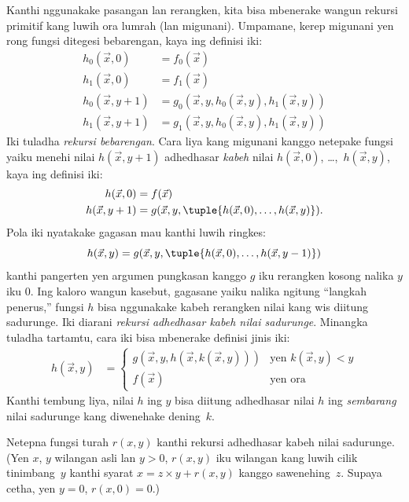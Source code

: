 \documentclass[../../../include/open-logic-section]{subfiles}
\begin{document}

Kanthi nggunakake pasangan lan rerangken, kita bisa
mbenerake wangun rekursi primitif kang luwih ora lumrah
(lan migunani). Umpamane, kerep migunani yen rong
fungsi ditegesi bebarengan, kaya ing definisi iki:
\begin{align*}
h_0(\vec x, 0) & = f_0(\vec x) \\
h_1(\vec x, 0) & = f_1(\vec x) \\
h_0(\vec x, y+1) & = g_0(\vec x, y, h_0(\vec x, y), h_1(\vec x, y)) \\
h_1(\vec x, y+1) & = g_1(\vec x, y, h_0(\vec x, y), h_1(\vec x, y))
\end{align*}
Iki tuladha \emph{rekursi bebarengan}. Cara liya
kang migunani kanggo netepake fungsi yaiku menehi
nilai $h(\vec x, y+1)$ adhedhasar \emph{kabeh}
nilai $h(\vec x, 0)$, \dots,~$h(\vec x, y)$,
kaya ing definisi iki:
\begin{align*}
h(\vec x, 0) & = f(\vec x) \\
h(\vec x, y+1) & = g(\vec x, y, \tuple{h(\vec x, 0), \dots, h(\vec x, y)}).
\end{align*}
Pola iki nyatakake gagasan mau kanthi luwih ringkes:
\[
h(\vec x, y) = g(\vec x, y, \tuple{h(\vec x, 0), \dots, h(\vec x, y-1)})
\]
kanthi pangerten yen argumen pungkasan kanggo $g$
iku rerangken kosong nalika $y$ iku $0$.
Ing kaloro wangun kasebut, gagasane yaiku nalika
ngitung ``langkah penerus,'' fungsi $h$ bisa
nggunakake kabeh rerangken nilai kang wis
diitung sadurunge. Iki diarani \emph{rekursi
adhedhasar kabeh nilai sadurunge}. Minangka
tuladha tartamtu, cara iki bisa mbenerake
definisi jinis iki:
\begin{align*}
h(\vec x, y) & = \begin{cases}
  g(\vec x, y, h(\vec x, k(\vec x, y))) & \text{yen $k(\vec x, y) < y$} \\
  f(\vec x) & \text{yen ora}
\end{cases}
\end{align*}
Kanthi tembung liya, nilai $h$ ing $y$ bisa
diitung adhedhasar nilai $h$ ing \emph{sembarang}
nilai sadurunge kang diwenehake dening~$k$.


\begin{prob}
  Netepna fungsi turah $r(x,y)$ kanthi rekursi
  adhedhasar kabeh nilai sadurunge. (Yen $x$, $y$
  wilangan asli lan $y > 0$, $r(x,y)$ iku wilangan
  kang luwih cilik tinimbang~$y$ kanthi syarat
  $x = z\times y + r(x,y)$ kanggo sawenehing~$z$.
  Supaya cetha, yen $y=0$, $r(x,0) = 0$.)
\end{prob}
\end{document}
